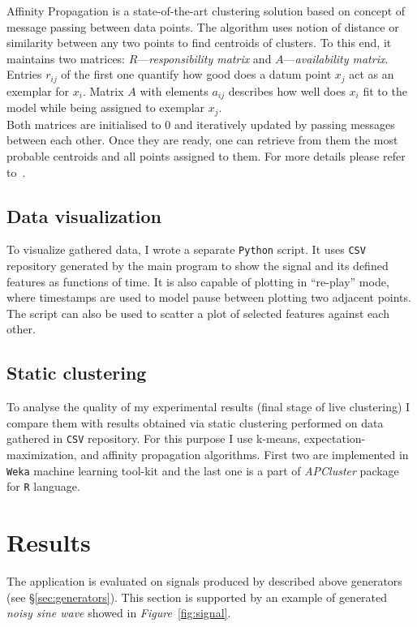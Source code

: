 \documentclass[11pt, letterpaper]{article}            %
\begin{document}
Affinity Propagation is a state-of-the-art clustering solution based on concept of message passing between data points. The algorithm uses notion of distance or similarity between any two points to find centroids of clusters. To this end, it maintains two matrices: $R$---\emph{responsibility matrix} and $A$---\emph{availability matrix}. Entries $r_{ij}$ of the first one quantify how good does a datum point $x_j$ act as an exemplar for $x_i$. Matrix $A$ with elements $a_{ij}$ describes how well does $x_i$ fit to the model while being assigned to exemplar $x_j$.\\
Both matrices are initialised to $0$ and iteratively updated by passing messages between each other. Once they are ready, one can retrieve from them the most probable centroids and all points assigned to them. For more details please refer to~\citep{frey07affinitypropagation}.\\

\subsection{Data visualization}
To visualize gathered data, I wrote a separate \texttt{Python} script. It uses \texttt{CSV} repository generated by the main program to show the signal and its defined features as functions of time. It is also capable of plotting in ``re-play'' mode, where timestamps are used to model pause between plotting two adjacent points.\\
The script can also be used to scatter a plot of selected features against each other.\\

\subsection{Static clustering}
To analyse the quality of my experimental results (final stage of live clustering) I compare them with results obtained via static clustering performed on data gathered in \texttt{CSV} repository. For this purpose I use k-means, expectation-maximization, and affinity propagation algorithms. First two are implemented in \texttt{Weka} machine learning tool-kit and the last one is a part of \emph{APCluster} package for \texttt{R} language.


\section{Results}
The application is evaluated on signals produced by described above generators (see §\ref{sec:generators}). This section is supported by an example of generated \emph{noisy sine wave} showed in \emph{Figure}~\ref{fig:signal}.\\
\end{document}
